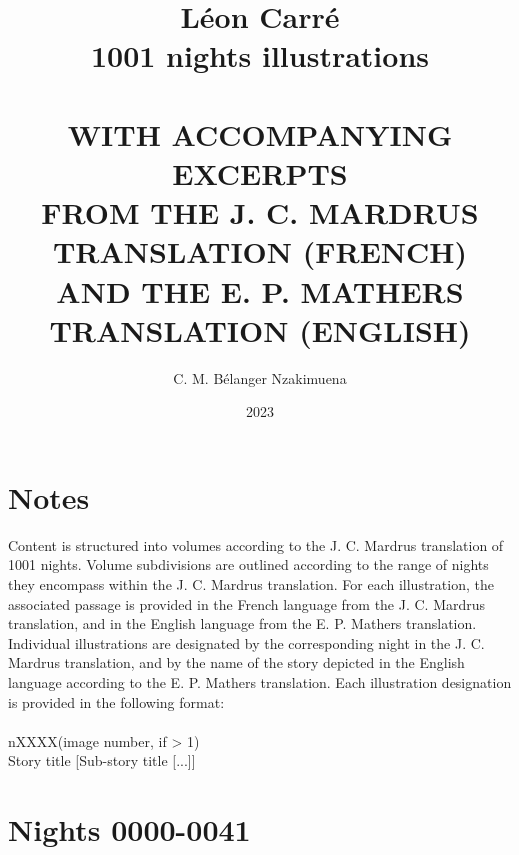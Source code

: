 \documentclass[a4paper,12pt,]{book}
\newcommand\tab[1][1cm]{\hspace*{#1}}
\begin{document}
\title{ 
\Huge{\textbf{Léon Carré \protect\\ 1001 nights illustrations}} \\~\\
\small{\uppercase{with accompanying excerpts \protect\\ from the J. C. Mardrus translation (French) \protect\\ and the E. P. Mathers translation (English)}}
} %
\author{C. M. Bélanger Nzakimuena}
\date{2023} %
\maketitle

\setlength\parindent{0pt} %
\let\cleardoublepage\clearpage %

\frontmatter
\tableofcontents %

\chapter*{Notes}
Content is structured into volumes according to the J. C. Mardrus translation of 1001 nights.  Volume subdivisions are outlined according to the range of nights they encompass within the J. C. Mardrus translation.  For each illustration, the associated passage is provided in the French language from the J. C. Mardrus translation, and in the English language from the E. P. Mathers translation.  Individual illustrations are designated by the corresponding night in the J. C. Mardrus translation, and by the name of the story depicted in the English language according to the E. P. Mathers translation.  Each illustration designation is provided in the following format: \\~\\
\tab\tab\tab\tab nXXXX(\textquotesingle image number\textquotesingle, if > 1)\\
\tab\tab\tab\tab Story title [Sub-story title [...]]

\mainmatter

\chapter{Nights 0000-0041}
\newpage

\end{document}
